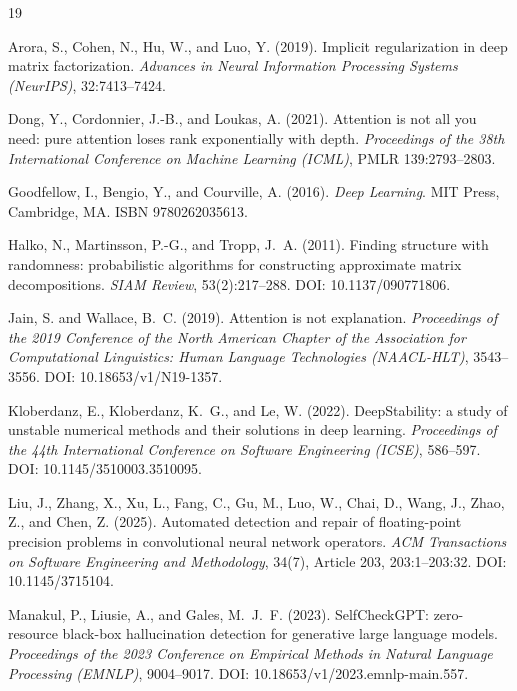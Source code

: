 \documentclass[11pt,a4paper]{article}
\theoremstyle{plain}
\begin{document}


\begin{thebibliography}{19}

Arora, S., Cohen, N., Hu, W., and Luo, Y. (2019).
Implicit regularization in deep matrix factorization.
\emph{Advances in Neural Information Processing Systems (NeurIPS)}, 32:7413--7424.

Dong, Y., Cordonnier, J.-B., and Loukas, A. (2021).
Attention is not all you need: pure attention loses rank exponentially with depth.
\emph{Proceedings of the 38th International Conference on Machine Learning (ICML)}, PMLR 139:2793--2803.

Goodfellow, I., Bengio, Y., and Courville, A. (2016).
\emph{Deep Learning}.
MIT Press, Cambridge, MA. ISBN 9780262035613.

Halko, N., Martinsson, P.-G., and Tropp, J.~A. (2011).
Finding structure with randomness: probabilistic algorithms for constructing approximate matrix decompositions.
\emph{SIAM Review}, 53(2):217--288.
DOI: 10.1137/090771806.

Jain, S. and Wallace, B.~C. (2019).
Attention is not explanation.
\emph{Proceedings of the 2019 Conference of the North American Chapter of the Association for Computational Linguistics: Human Language Technologies (NAACL-HLT)}, 3543--3556.
DOI: 10.18653/v1/N19-1357.

Kloberdanz, E., Kloberdanz, K.~G., and Le, W. (2022).
DeepStability: a study of unstable numerical methods and their solutions in deep learning.
\emph{Proceedings of the 44th International Conference on Software Engineering (ICSE)}, 586--597.
DOI: 10.1145/3510003.3510095.

Liu, J., Zhang, X., Xu, L., Fang, C., Gu, M., Luo, W., Chai, D., Wang, J., Zhao, Z., and Chen, Z. (2025).
Automated detection and repair of floating-point precision problems in convolutional neural network operators.
\emph{ACM Transactions on Software Engineering and Methodology}, 34(7), Article 203, 203:1--203:32.
DOI: 10.1145/3715104.

Manakul, P., Liusie, A., and Gales, M.~J.~F. (2023).
SelfCheckGPT: zero-resource black-box hallucination detection for generative large language models.
\emph{Proceedings of the 2023 Conference on Empirical Methods in Natural Language Processing (EMNLP)}, 9004--9017.
DOI: 10.18653/v1/2023.emnlp-main.557.


\end{thebibliography}
\end{document}
